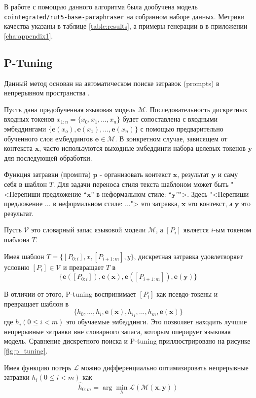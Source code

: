 В работе с помощью данного алгоритма была дообучена модель \texttt{cointegrated/rut5-base-paraphraser} на собранном наборе данных.
Метрики качества указаны в таблице \ref{table:results}, а примеры генерации в  в приложении \ref{cha:appendix1}.


\subsection{P-Tuning}
Данный метод основан на автоматическом поиске затравок (prompts) в непрерывном пространства \cite{gpt_understands_too}.

Пусть дана предобученная языковая модель $\mathcal{M}$.
Последовательность дискретных входных токенов 
$x_{1:n} = \{x_0, x_1, ..., x_n\}$
будет сопоставлена с входными эмбеддингами 
$\{\mathbf{e}(x_o), \mathbf{e}(x_1), ..., \mathbf{e}(x_n)\}$
с помощью предварительно обученного слоя ембеддингов
$\mathbf{e} \in \mathcal{M}$.
В конкретном случае, зависящем от контекста $\mathbf{x}$, часто используются выходные эмбеддинги набора целевых токенов  $\mathbf{y}$ для последующей обработки.

Функция затравки (промпта) $\mathbf{p}$ - организовать контекст $\mathbf{x}$, результат $\mathbf{y}$ и саму себя в шаблон $T$.
Для задачи переноса стиля текста шаблоном может быть "<Перепиши предложение "`$\mathbf{x}$"' в неформальном стиле: "`$\mathbf{y}$"'">.
Здесь "<Перепиши предложение ... в неформальном стиле: ..."> это затравка, $\mathbf{x}$ это контекст, а $\mathbf{y}$ это результат.

Пусть $\mathcal{V}$ это словарный запас языковой модели $\mathcal{M}$, а $[P_i]$ является $i$-ым токеном шаблона $T$.

Имея шаблон $T = \{ [P_{0:i}],x,[P_{i+1:m}], y \}$, дискретная затравка удовлетворяет условию $[P_i] \in \mathcal{V}$ и превращает $T$ в
$$\{ \mathbf{e}([P_{0:i}]), \mathbf{e}(\mathbf{x}), \mathbf{e}([P_{i+1:m}]),\mathbf{e}(\mathbf{y}) \}$$

В отличии от этого, P-tuning воспринимает $[P_i]$ как псевдо-токены и превращает шаблон в
$$\{h_0, ..., h_i, \mathbf{e}(\mathbf{x}), h_{i_1}, ..., h_m, \mathbf{e}(\mathbf{x})\}$$
где $h_i(0 \leqslant i < m)$ это обучаемые эмбеддинги.
Это позволяет находить лучшие непрерывные затравки вне словарного запаса, которым оперирует языковая модель.
Сравнение дискретного поиска и P-tuning приллюстрировано на рисунке \ref{fig:p_tuning}.

Имея функцию потерь $\mathcal{L}$ можно дифференциально оптимизировать непрерывные затравки $h_i(0 \leqslant i < m)$ как
$$\hat{h}_{0:m} = \arg\min_h \mathcal{L} (\mathcal{M}(\mathbf{x},\mathbf{y}))$$

